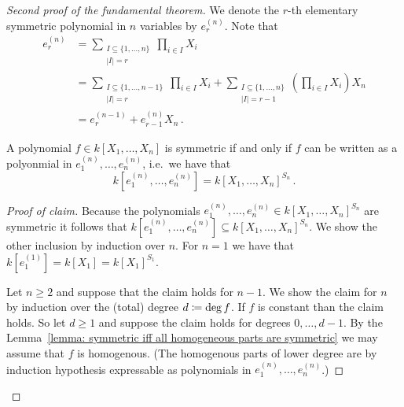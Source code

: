 \begin{proof}[Second proof of the fundamental theorem]
  We denote the $r$-th elementary symmetric polynomial in $n$ variables by $e^{(n)}_r$.
  Note that
  \begin{equation}
    \label{equation: recursive formel for elementary symmetric polynomials}
    \begin{aligned}
          e^{(n)}_r
      &=  \sum_{\substack{I \subseteq \{1, \dotsc, n\} \\ |I| = r}} \prod_{i \in I} X_i \\
      &=    \sum_{\substack{I \subseteq \{1, \dotsc, n-1\} \\ |I| = r}} \prod_{i \in I} X_i
          + \sum_{\substack{I \subseteq \{1, \dotsc, n\} \\ |I| = r-1}} \left( \prod_{i \in I} X_i \right) X_n  \\
      &=  e^{(n-1)}_r + e^{(n)}_{r-1} X_n \,.
    \end{aligned}
  \end{equation}
  \begin{claim}
    A polynomial $f \in k[X_1, \dotsc, X_n]$ is symmetric if and only if $f$ can be written as a polyonmial in $e^{(n)}_1, \dotsc, e^{(n)}_n$, i.e.\ we have that
    \[
        k\left[ e^{(n)}_1, \dotsc, e^{(n)}_n \right]
      = k[X_1, \dotsc, X_n]^{S_n} \,.
    \]
  \end{claim}
  \begin{proof}[Proof of claim]
    Because the polynomials $e^{(n)}_1, \dotsc, e^{(n)}_n \in k[X_1, \dotsc, X_n]^{S_n}$ are symmetric it follows that $k[ e^{(n)}_1, \dotsc, e^{(n)}_n ] \subseteq k[X_1, \dotsc, X_n]^{S_n}$.
    We show the other inclusion by induction over $n$.
    For $n = 1$ we have that $k[ e^{(1)}_1 ] = k[X_1] = k[X_1]^{S_1}$.
    
    Let $n \geq 2$ and suppose that the claim holds for $n-1$.
    We show the claim for $n$ by induction over the (total) degree $d \coloneqq \deg f$.
    If $f$ is constant than the claim holds.
    So let $d \geq 1$ and suppose the claim holds for degrees $0, \dotsc, d-1$.
    By the Lemma~\ref{lemma: symmetric iff all homogeneous parts are symmetric} we may assume that $f$ is homogenous.
    (The homogenous parts of lower degree are by induction hypothesis expressable as polynomials in $e^{(n)}_1, \dotsc, e^{(n)}_n$.)
    

\end{proof}
\end{proof}
